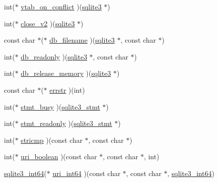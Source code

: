\begin{DoxyCompactItemize}
\item 
int($\ast$ \hyperlink{structsqlite3__api__routines_a888c89ab06f21c953c7c27fdc00dd86c}{vtab\+\_\+on\+\_\+conflict} )(\hyperlink{sqlite3_8h_a0ef6f2646262c8a9b24368d8ac140f69}{sqlite3} $\ast$)
\item 
int($\ast$ \hyperlink{structsqlite3__api__routines_abb98b8486cbe7d739b8840d3d90baa30}{close\+\_\+v2} )(\hyperlink{sqlite3_8h_a0ef6f2646262c8a9b24368d8ac140f69}{sqlite3} $\ast$)
\item 
const char $\ast$($\ast$ \hyperlink{structsqlite3__api__routines_a100ccb514682b7eb4280ababd67e9831}{db\+\_\+filename} )(\hyperlink{sqlite3_8h_a0ef6f2646262c8a9b24368d8ac140f69}{sqlite3} $\ast$, const char $\ast$)
\item 
int($\ast$ \hyperlink{structsqlite3__api__routines_a192b2ee2b6bd5a57cbb74bf72266a9e7}{db\+\_\+readonly} )(\hyperlink{sqlite3_8h_a0ef6f2646262c8a9b24368d8ac140f69}{sqlite3} $\ast$, const char $\ast$)
\item 
int($\ast$ \hyperlink{structsqlite3__api__routines_a32bf57d7ff76e4153ca7fe2552bd168f}{db\+\_\+release\+\_\+memory} )(\hyperlink{sqlite3_8h_a0ef6f2646262c8a9b24368d8ac140f69}{sqlite3} $\ast$)
\item 
const char $\ast$($\ast$ \hyperlink{structsqlite3__api__routines_a853ce95bc126e615a9ba9b30de8fbb62}{errstr} )(int)
\item 
int($\ast$ \hyperlink{structsqlite3__api__routines_a046c107f8b417c85acc32a4d964aa913}{stmt\+\_\+busy} )(\hyperlink{sqlite3_8h_af2a033da1327cdd77f0a174a09aedd0c}{sqlite3\+\_\+stmt} $\ast$)
\item 
int($\ast$ \hyperlink{structsqlite3__api__routines_a04499bf64d666eb00fb19ae01cdbb8b1}{stmt\+\_\+readonly} )(\hyperlink{sqlite3_8h_af2a033da1327cdd77f0a174a09aedd0c}{sqlite3\+\_\+stmt} $\ast$)
\item 
int($\ast$ \hyperlink{structsqlite3__api__routines_aa6c2af28787384ae1f266ba2d7d97972}{stricmp} )(const char $\ast$, const char $\ast$)
\item 
int($\ast$ \hyperlink{structsqlite3__api__routines_ac0aebc3fb86e2537e04be6db52d4a395}{uri\+\_\+boolean} )(const char $\ast$, const char $\ast$, int)
\item 
\hyperlink{sqlite3_8h_a0a4d3e6c1ad46f90e746b920ab6ca0d2}{sqlite3\+\_\+int64}($\ast$ \hyperlink{structsqlite3__api__routines_a70dfce68b81e6c77b3e6c3d8e874c070}{uri\+\_\+int64} )(const char $\ast$, const char $\ast$, \hyperlink{sqlite3_8h_a0a4d3e6c1ad46f90e746b920ab6ca0d2}{sqlite3\+\_\+int64})
\item 

\end{DoxyCompactItemize}

